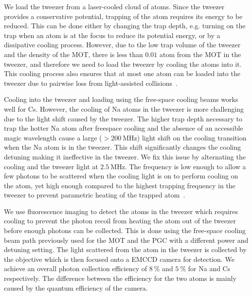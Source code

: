 We load the tweezer from a laser-cooled cloud of atoms.
Since the tweezer provides a conservative potential,
trapping of the atom requires its energy to be reduced.
This can be done either by changing the trap depth,
e.g. turning on the trap when an atom is at the focus to reduce its potential energy,
or by a dissipative cooling process.
However, due to the low trap volume of the tweezer and the density of the MOT,
there is less than $0.01$ atom from the MOT in the tweezer,
and therefore we need to load the tweezer by cooling the atoms into it.
This cooling process also ensures that at most one atom can be loaded into the tweezer
due to pairwise loss from light-assisted collisions~\cite{schlosser_sub-poissonian_2001}.

Cooling into the tweezer and loading using the free-space cooling beams works well for Cs.
However, the cooling of Na atoms in the tweezer is more challenging
due to the light shift caused by the tweezer.
The higher trap depth necessary to trap the hotter Na atom after freespace cooling
and the absence of an accessible magic wavelength cause a large ($>\!200~\mathrm{MHz}$)
light shift on the cooling transition when the Na atom is in the tweezer.
This shift significantly changes the cooling detuning making it ineffective in the tweezer.
We fix this issue by alternating the cooling and the tweezer light at $2.5~\mathrm{MHz}$.
The frequency is low enough to allow a few photons to be scattered
when the cooling light is on to perform cooling on the atom,
yet high enough compared to the highest trapping frequency in the tweezer
to prevent parametric heating of the trapped atom~\cite{hutzler_eliminating_2017}.

We use fluorescence imaging to detect the atoms in the tweezer
which requires cooling to prevent the photon recoil from heating the atom out of the tweezer
before enough photons can be collected.
This is done using the free-space cooling beam path previously used for the MOT and the PGC
with a different power and detuning setting.
The light scattered from the atom in the tweezer is collected by the objective
which is then focused onto a EMCCD camera for detection.
We achieve an overall photon collection efficiency of $8~\mathrm{\%}$ and $5~\mathrm{\%}$
for Na and Cs respectively.
The difference between the efficiency for the two atoms
is mainly caused by the quantum efficiency of the camera.

